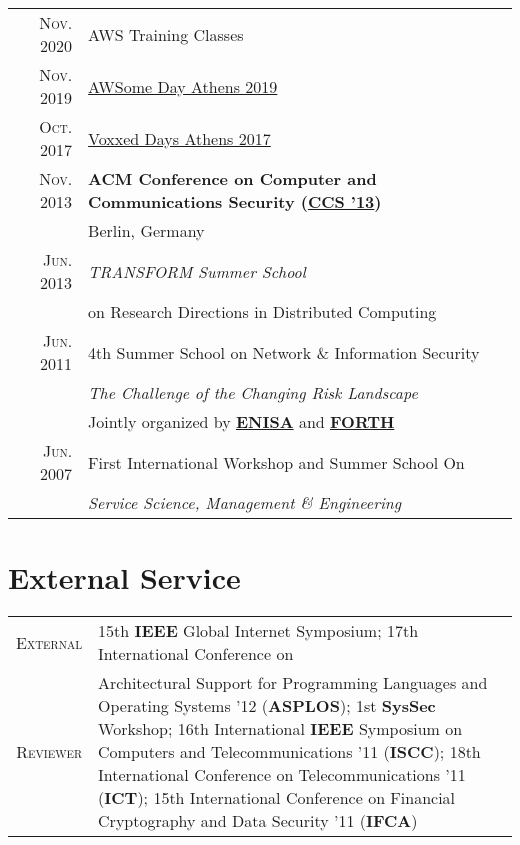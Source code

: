 \documentclass[a4paper,10pt]{article} %
\begin{document}
\begin{tabular}{rl}

\textsc{Nov. 2020} & AWS Training Classes \\

\textsc{Nov. 2019} & \href{https://thebeat.co/en/blog/awsome-day-athens-2019/?intl=1}{AWSome Day Athens 2019} \\

\textsc{Oct. 2017} & \href{https://voxxeddays.com/athens17/}{Voxxed Days Athens 2017} \\

\textsc{Nov. 2013} & \textbf{ACM Conference on Computer and Communications Security (\href{http://www.sigsac.org/ccs/CCS2013/}{CCS '13})} \\
& Berlin, Germany \\

\textsc{Jun. 2013} & \emph{TRANSFORM Summer School} \\
& on Research Directions in Distributed Computing \\

\textsc{Jun. 2011} & 4th Summer School on Network \& Information Security \\
& \emph{The Challenge of the Changing Risk Landscape} \\
& \small Jointly organized by \textbf{\href{https://www.enisa.europa.eu/}{ENISA}} and \textbf{\href{https://www.forth.gr/}{FORTH}} \\

\textsc{Jun. 2007} & First International Workshop and Summer School On \\
& \emph{Service Science, Management \& Engineering}

\end{tabular}


\section{External Service}

\begin{tabular}{rp{12cm}}

\textsc{External} & 15th \textbf{IEEE} Global Internet Symposium; 17th International Conference on \\
\textsc{Reviewer} & Architectural Support for Programming Languages and Operating Systems '12 (\textbf{ASPLOS}); 1st \textbf{SysSec} Workshop; 16th International \textbf{IEEE} Symposium on Computers and Telecommunications '11 (\textbf{ISCC}); 18th International Conference on Telecommunications '11 (\textbf{ICT}); 15th International Conference on Financial Cryptography and Data Security '11 (\textbf{IFCA}) 

\end{tabular}
\end{document}

